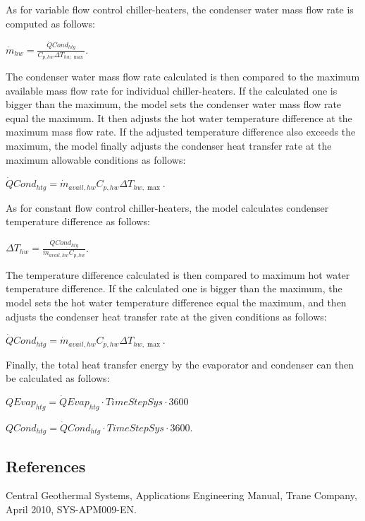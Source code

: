 As for variable flow control chiller-heaters, the condenser water mass flow rate is computed as follows:

\textbf{\emph{\({\dot m_{hw}} = \frac{{\dot QCon{d_{htg}}}}{{{C_{p,hw}}\Delta {T_{hw,\max }}}}\)}}.

The condenser water mass flow rate calculated is then compared to the maximum available mass flow rate for individual chiller-heaters. If the calculated one is bigger than the maximum, the model sets the condenser water mass flow rate equal the maximum. It then adjusts the hot water temperature difference at the maximum mass flow rate. If the adjusted temperature difference also exceeds the maximum, the model finally adjusts the condenser heat transfer rate at the maximum allowable conditions as follows:

\textbf{\emph{\(\dot QCon{d_{htg}} = {\dot m_{avail,hw}}{C_{p,hw}}\Delta {T_{hw,\max }}\)}}.

As for constant flow control chiller-heaters, the model calculates condenser temperature difference as follows:

\textbf{\emph{\(\Delta {T_{hw}} = \frac{{\dot QCon{d_{htg}}}}{{{{\dot m}_{avail,hw}}{C_{p,hw}}}}\)}}.

The temperature difference calculated is then compared to maximum hot water temperature difference. If the calculated one is bigger than the maximum, the model sets the hot water temperature difference equal the maximum, and then adjusts the condenser heat transfer rate at the given conditions as follows:

\textbf{\emph{\(\dot QCon{d_{htg}} = {\dot m_{avail,hw}}{C_{p,hw}}\Delta {T_{hw,\max }}\)}}.

Finally, the total heat transfer energy by the evaporator and condenser can then be calculated as follows:

\textbf{\emph{\(QEva{p_{htg}} = \dot QEva{p_{htg}} \cdot TimeStepSys \cdot 3600\)}}

\textbf{\emph{\(QCon{d_{htg}} = \dot QCon{d_{htg}} \cdot TimeStepSys \cdot 3600\)}}.

\subsection{References}\label{references-008}

Central Geothermal Systems, Applications Engineering Manual, Trane Company, April 2010, SYS-APM009-EN.
